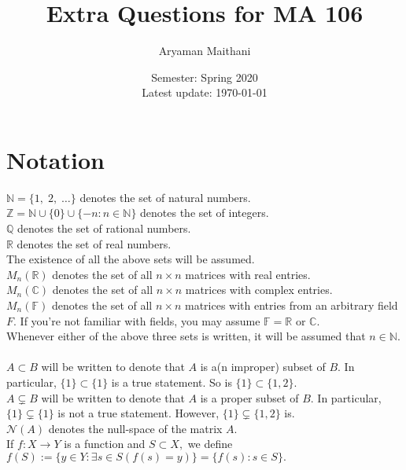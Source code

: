 \documentclass{article}
\title{Extra Questions for MA 106}
\author{Aryaman Maithani}%
\date{Semester: Spring 2020\\ Latest update: \today}
\begin{document}
\maketitle
\tableofcontents
\hrulefill
\setcounter{section}{-1}
\section{Notation}

$\mathbb{N} = \{1,\; 2,\; \ldots\}$ denotes the set of natural numbers.\\
$\mathbb{Z} = \mathbb{N} \cup \{0\} \cup \{-n : n\in\mathbb{N}\}$ denotes the set of integers.\\
$\mathbb{Q}$ denotes the set of rational numbers.\\
$\mathbb{R}$ denotes the set of real numbers.\\
The existence of all the above sets will be assumed.\\
$M_n(\mathbb{R})$ denotes the set of all $n\times n$ matrices with real entries.\\
$M_n(\mathbb{C})$ denotes the set of all $n\times n$ matrices with complex entries.\\
$M_n(\mathbb{F})$ denotes the set of all $n\times n$ matrices with entries from an arbitrary field $F.$ If you're not familiar with fields, you may assume $\mathbb{F} = \mathbb{R}$ or $\mathbb{C}.$\\
Whenever either of the above three sets is written, it will be assumed that $n \in \mathbb{N}.$\\~\\
$A \subset B$ will be written to denote that $A$ is a(n improper) subset of $B.$ In particular, $\{1\} \subset \{1\}$ is a true statement. So is $\{1\} \subset \{1, 2\}.$\\
$A \subsetneq B$ will be written to denote that $A$ is a proper subset of $B.$ In particular, $\{1\} \subsetneq \{1\}$ is not a true statement. However, $\{1\} \subsetneq \{1, 2\}$ is.\\
$\mathcal{N}(A)$ denotes the null-space of the matrix $A.$\\
If $f:X\to Y$ is a function and $S \subset X,$ we define $f(S) := \{y \in Y : \exists s \in S(f(s) = y)\} = \{f(s) : s \in S\}.$

\hrulefill
\end{document}

